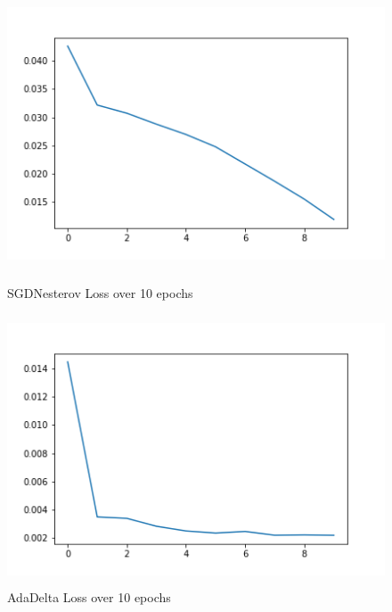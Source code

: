 \documentclass[12pt]{article}
\begin{document}
\begin{figure}[H]
  \includegraphics[width=\linewidth, height=80mm]{images/sgdloss.png}
  \caption{SGDNesterov Loss over 10 epochs}
  
  \includegraphics[width=\linewidth, height=80mm]{images/adadeltaloss.png}
  \caption{AdaDelta Loss over 10 epochs}
\end{figure}
\end{document}
